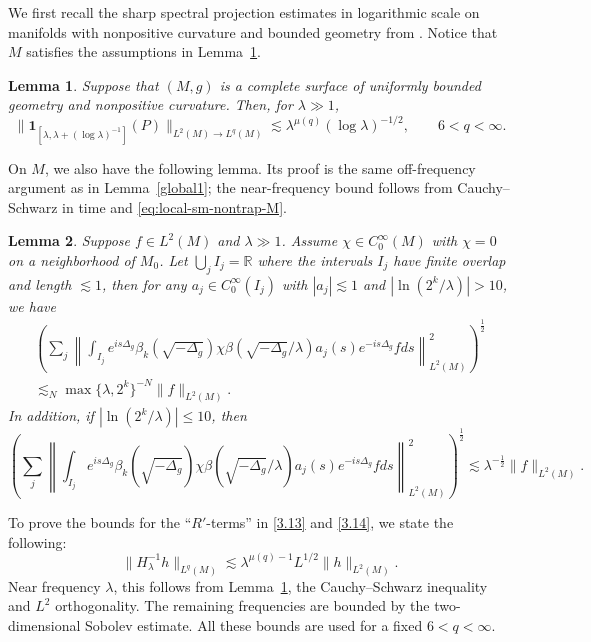 \documentclass[11pt]{amsart}
\newcommand{\la}{\lambda}
\newtheorem{lemma}{Lemma}[section]
\begin{document}
We first recall the sharp spectral projection estimates in logarithmic scale on manifolds with nonpositive curvature and bounded geometry from \cite[Theorem 1.6]{HSTZ}. Notice that $M$ satisfies the assumptions in Lemma~\ref{bgsp}.
\begin{lemma}\label{bgsp}
Suppose that $(M,g)$ is a complete surface of uniformly bounded geometry and nonpositive curvature. Then, for $\la\gg1$,
\begin{equation}\label{i.6}
\|\mathbf{1}_{[\la,\la+(\log\la)^{-1}]}(P)\|_{L^2(M)\to L^q(M)}
\lesssim\la^{\mu(q)}(\log\la)^{-1/2},\qquad 6<q<\infty.
\end{equation}
\end{lemma}
On $M$, we also have the following lemma. Its proof is the same off-frequency argument as in Lemma~\ref{global1}; the near-frequency bound follows from Cauchy--Schwarz in time and \eqref{eq:local-sm-nontrap-M}.
\begin{lemma}\label{global2}
Suppose $f\in L^2(M)$ and $\la\gg1$. 
Assume $\chi \in C_0^{\infty}(M)$ with $\chi=0$ on a neighborhood of $M_{0}$.
    Let $\bigcup_{j} I_j=\mathbb R$ where the intervals $I_j$ have finite overlap and length $\lesssim 1$, then for any $a_j\in C_0^\infty(I_j)$ with $|a_j|\lesssim 1$ and $|\ln(2^k/\la)|> 10$, we have
\begin{multline}\label{eq:guess-3}
  \left( \sum_{j}  \left\| \int_{I_j} e^{is\Delta_{g}} \beta_{k}(\sqrt{-\Delta_{g}})\chi \beta(\sqrt{-\Delta_g}/\la) a_j(s)e^{-is\Delta_g}f ds \right\|^2_{L^2(M)}\right)^{\frac12}\\
  \lesssim_N     \max\{\la,2^{k}    \}^{-N}\|f\|_{L^2(M)}.
\end{multline} 
In addition, if $|\ln(2^k/\la)|\leq 10$, then
\begin{equation}\label{eq:guess-33}
    \left( \sum_{j} \left\| \int_{I_j} e^{is\Delta_{g}} \beta_{k}(\sqrt{-\Delta_{ g}})\chi\beta(\sqrt{-\Delta_g}/\la) a_j(s)e^{-is\Delta_g}f ds \right\|^2_{L^2(M)}\right)^{\frac12}\lesssim \la^{-\frac12}\|f\|_{L^2(M)}.
\end{equation}
\end{lemma}

To prove the bounds for the ``$R'$-terms'' in \eqref{3.13} and \eqref{3.14}, we state the following:
\begin{equation}\label{3.15}
\|H_\la^{-1}h\|_{L^q(M)}
\lesssim\la^{\mu(q)-1}L^{1/2}\|h\|_{L^2(M)}.
\end{equation}
Near frequency $\la$, this follows from Lemma~\ref{bgsp}, the Cauchy--Schwarz inequality and $L^2$ orthogonality. The remaining frequencies are bounded by the two-dimensional Sobolev estimate. All these bounds are used for a fixed $6<q<\infty$.
\end{document}

